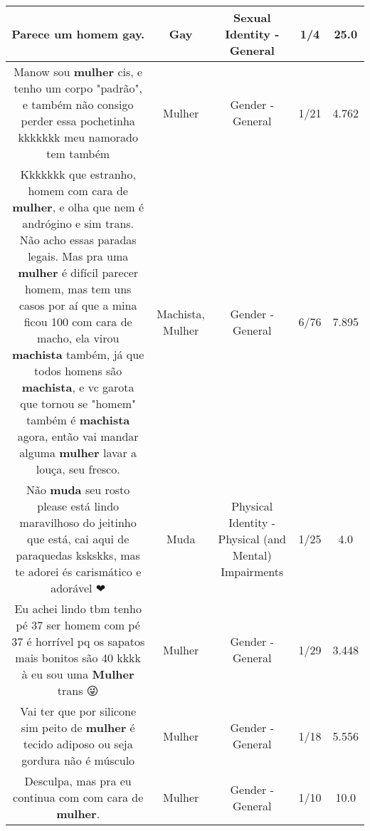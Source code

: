 \documentclass[11pt]{article}
\newlength\mylength
\begin{document}
\begin{center}
\begin{longtable}{|C{.65\mylength}|C{.30\mylength}|C{.12\mylength}|C{.12\mylength}|C{.12\mylength}|}
  \small Parece um homem \textbf{gay}.\normalsize   & Gay & Sexual Identity - General & 1/4 & 25.0 \\  \hline
  \small Manow sou \textbf{mulher} cis, e tenho um corpo "padrão", e também não consigo perder essa pochetinha kkkkkkk meu namorado tem também\normalsize   & Mulher & Gender - General & 1/21 & 4.762 \\  \hline
  \small Kkkkkkk que estranho, homem com cara de \textbf{mulher}, e olha que nem é andrógino e sim trans. Não acho essas paradas legais. Mas pra uma \textbf{mulher} é difícil parecer homem, mas tem uns casos por aí que a mina ficou 100 com cara de macho, ela virou \textbf{machista} também, já que todos homens são \textbf{machista}, e vc garota que tornou se "homem" também é \textbf{machista} agora, então vai mandar alguma \textbf{mulher} lavar a louça, seu fresco.\normalsize   & Machista, Mulher & Gender - General & 6/76 & 7.895 \\  \hline
  \small Não \textbf{muda} seu rosto please está lindo maravilhoso do jeitinho que está, cai aqui de paraquedas kskskks, mas te adorei és carismático e adorável ❤\normalsize   & Muda & Physical Identity - Physical (and Mental) Impairments & 1/25 & 4.0 \\  \hline
  \small Eu achei lindo tbm tenho pé 37 ser homem com pé 37 é horrível pq os sapatos mais bonitos são 40 kkkk à eu sou uma \textbf{Mulher} trans 😜\normalsize   & Mulher & Gender - General & 1/29 & 3.448 \\  \hline
  \small Vai ter que por silicone sim peito de \textbf{mulher} é tecido adiposo ou seja gordura não é músculo\normalsize   & Mulher & Gender - General & 1/18 & 5.556 \\  \hline
  \small Desculpa, mas pra eu continua com com cara de \textbf{mulher}.\normalsize   & Mulher & Gender - General & 1/10 & 10.0 \\  \hline

\end{longtable}
\end{center}
\end{document}
